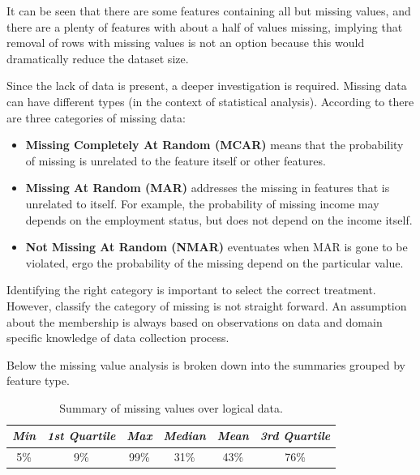 It can be seen that there are some features containing all but missing values, and there are a plenty of features with about a half of values missing, implying that removal of rows with missing values is not an option because this would dramatically reduce the dataset size.

Since the lack of data is present, a deeper investigation is required. Missing data can have different types (in the context of statistical analysis). According to \cite{Allison:2007} there are three categories of missing data:

 \begin{itemize}
    \item \textbf{Missing Completely At Random (MCAR)} means that the probability of missing is unrelated to the feature itself or other features. 
    \item \textbf{Missing At Random (MAR)} addresses the missing in features that is unrelated to itself. For example, the probability of missing income may depends on the employment status, but does not depend on the income itself.
    \item \textbf{Not Missing At Random (NMAR)} eventuates when MAR is gone to be violated, ergo the probability of the missing depend on the particular value.
 \end{itemize}

Identifying the right category is important to select the correct treatment. However, classify the category of missing is not straight forward. An assumption about the membership is always based on observations on data and domain specific knowledge of data collection process.

Below the missing value analysis is broken down into the summaries grouped by feature type.

 \begin{table}[h!]
  \begin{center}
    \caption{Summary of missing values over logical data.}
    \label{tab:missings-over-logical}
    \begin{tabular}{|c|c|c|c|c|c|}\hline
    \textit{Min} & \textit{1st Quartile}& \textit{Max} & \textit{Median} & \textit{Mean} & \textit{3rd Quartile} \\
      \hline
     5\% & 9\% & 99\% & 31\% & 43\% & 76\% \\ 
     \hline 
    \end{tabular}
  \end{center}
\end{table}
 
